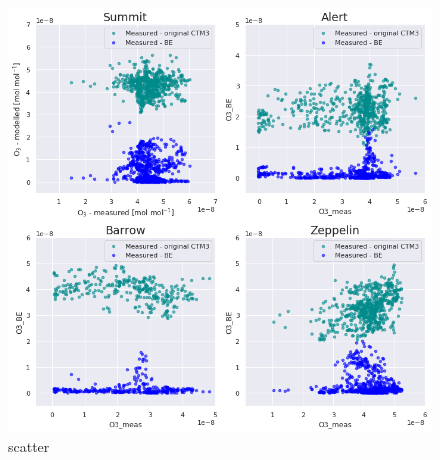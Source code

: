 \begin{figure}[h]
    \centering
    \includegraphics[width = \linewidth]{Chapter6_Results/images/scatter_feb_apr.png}
    \caption{scatter}
    \label{fig:scatter_FebApr}
\end{figure}